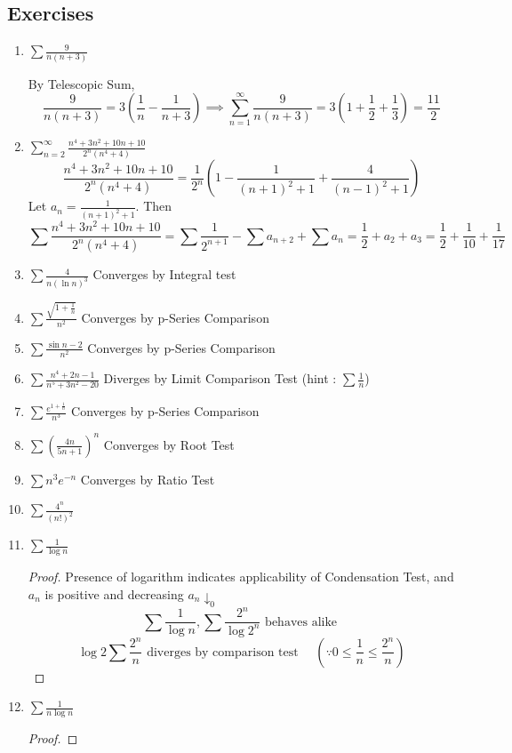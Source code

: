 \subsection*{Exercises}
\begin{enumerate}
	\item $\sum \frac{9}{n(n+3)}$

		By Telescopic Sum,
		$$ \frac{9}{n(n+3)} = 3\left( \frac{1}{n} - \frac{1}{n+3}\right) \implies \sum_{n=1}^\infty \frac{9}{n(n+3)} = 3\left( 1 + \frac{1}{2} + \frac{1}{3}\right) = \frac{11}{2} $$
	\item $\displaystyle \sum_{n=2}^\infty \frac{n^4+3n^2+10n+10}{2^n(n^4+4)}$
		$$ \frac{n^4+3n^2+10n+10}{2^n(n^4+4)} = \frac{1}{2^n} \left(1 - \frac{1}{(n+1)^2+1} + \frac{4}{(n-1)^2+1} \right)$$
		Let $a_n = \frac{1}{(n+1)^2+1}$. Then
		$$ \sum \frac{n^4+3n^2+10n+10}{2^n(n^4+4)} = \sum \frac{1}{2^{n+1}} - \sum a_{n+2} + \sum a_n = \frac{1}{2} + a_2 + a_3 = \frac{1}{2} + \frac{1}{10} + \frac{1}{17}  $$
	\item $\sum \frac{4}{n(\ln n)^3}$
		Converges by Integral test
	\item $\sum \frac{\sqrt{1+\frac{1}{n}}}{n^2}$
		Converges by p-Series Comparison
	\item $\sum \frac{\sin n - 2}{n^2}$
		Converges by p-Series Comparison
	\item $\sum \frac{n^4+2n-1}{n^5+3n^2-20}$
		Diverges by Limit Comparison Test (hint : $\sum \frac{1}{n}$)
	\item $\sum \frac{e^{1+\frac{1}{n}}}{n^3}$
		Converges by p-Series Comparison	
	\item $\sum \left(\frac{4n}{5n+1}\right)^n$
		Converges by Root Test
	\item $\sum n^3e^{-n}$
		Converges by Ratio Test
	\item $\sum \frac{4^n}{(n!)^2}$
	\item $\sum \frac{1}{\log n}$
	\begin{proof}
		Presence of logarithm indicates applicability of Condensation Test, and $a_n$ is positive and decreasing $a_n \downarrow_0$
		$$ \sum \frac{1}{\log n}, \sum \frac{2^n}{\log 2^n} \text{ behaves alike }$$
		$$ \log 2 \sum \frac{2^n}{n} \text{ diverges by comparison test } \quad \left( \because 0 \le \frac{1}{n} \le \frac{2^n}{n} \right) $$
	\end{proof}
	\item $\sum \frac{1}{n\log n}$
	\begin{proof}

\end{proof}
\end{enumerate}
